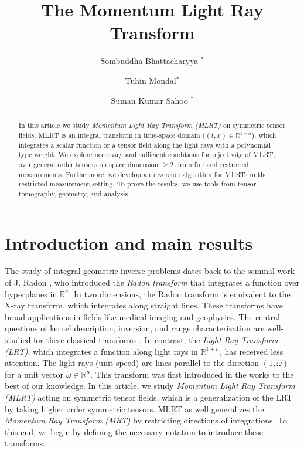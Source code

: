 \documentclass[11pt,a4paper,reqno]{amsart}
\title[The Momentum Light Ray Transform
]{The Momentum Light Ray Transform}
\author[Bhattacharyya]{Sombuddha Bhattacharyya $^\ast$}
\author[Mondal]{Tuhin Mondal$^\ast$}
\author[Sahoo]{Suman Kumar Sahoo $^\dagger$ }
\date{}
\begin{document}
\begin{abstract}
In this article we study \emph{Momentum Light Ray Transform (MLRT)} on symmetric tensor fields. MLRT is an integral transform in time-space domain ($(t,x)\in \mathbb{R}^{1+n}$), which integrates a scalar function or a tensor field along the light rays with a polynomial type weight. 
We explore necessary and sufficient conditions for injectivity of MLRT, over general order tensors on space dimension $\geq 2$, from full and restricted measurements.
Furthermore, we develop an inversion algorithm for MLRTs in the restricted measurement setting. 
To prove the results, we use tools from tensor tomography, geometry, and analysis.
\end{abstract}


\maketitle

\section{Introduction and main results}
The study of integral geometric inverse problems dates back to the seminal work of J. Radon \cite{Radon}, who introduced the \emph{Radon transform} that integrates a function over hyperplanes in $\mathbb{R}^n$. In two dimensions, the Radon transform is equivalent to the X-ray transform, which integrates along straight lines. These transforms have broad applications in fields like medical imaging and geophysics. 
The central questions of kernel description, inversion, and range characterization are well-studied for these classical transforms \cite{Sharafutdinov_book, Paternain_Salo_Uhlmann_2023}. In contrast, the \emph{Light Ray Transform (LRT)}, which integrates a function along light rays in $\mathbb{R}^{1+n}$, has received less attention. 
The light rays (unit speed) are lines parallel to the direction $(1, \omega)$ for a unit vector $\omega \in \mathbb{R}^n$.  This transform was first introduced in the works \cite{stefanov1989inverse,ramm1991inverse} to the best of our knowledge. 
In this article, we study \emph{Momentum Light Ray Transform (MLRT)} acting on symmetric tensor fields, which is a generalization of the LRT by taking higher order symmetric tensors.
MLRT as well generalizes the \emph{Momentum Ray Transform (MRT)} by restricting directions of integrations. To this end, we begin by defining the necessary notation to introduce these transforms.      
\end{document}

